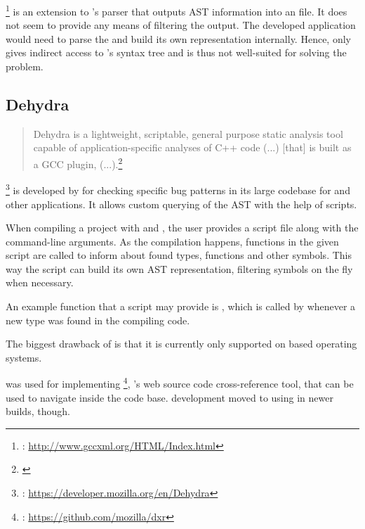 \footnote{: \url{http://www.gccxml.org/HTML/Index.html}} is an extension to 's  parser that outputs AST information into an  file. It does not seem to provide any means of filtering the output. The developed application would need to parse the  and build its own representation internally. Hence,  only gives indirect access to 's syntax tree and is thus not well-suited for solving the problem.

\subsection{Dehydra}

\begin{quotation}
Dehydra is a lightweight, scriptable, general purpose static analysis tool capable of application-specific analyses of C++ code (...) [that] is built as a GCC plugin, (...).\footnote{\citep{MDNDehydra}}
\end{quotation}

\footnote{: \url{https://developer.mozilla.org/en/Dehydra}} is developed by  for checking specific bug patterns in its large codebase for  and other  applications. It allows custom querying of the AST with the help of  scripts.

When compiling a project with  and , the user provides a script file along with the command-line arguments. As the compilation happens, functions in the given script are called to inform about found types, functions and other symbols. This way the script can build its own AST representation, filtering symbols on the fly when necessary.

An example function that a script may provide is , which is called by  whenever a new type was found in the compiling code.

The biggest drawback of  is that it is currently only supported on  based operating systems.

 was used for implementing \footnote{: \url{https://github.com/mozilla/dxr}}, 's web source code cross-reference tool, that can be used to navigate inside the  code base.  development moved to using  in newer builds, though.

